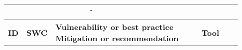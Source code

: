 
\begin{table*}
\centering
\begin{adjustbox}{max height=10cm}
\begin{tabular}{|c|c|m{9cm}|m{5mm}|m{5mm}|m{5mm}|m{5mm}|m{5mm}|m{5mm}|m{5mm}|}

\multicolumn{3}{c}{\.} &
\headrow{EY Review} &
\headrow{Smart Check} &
\headrow{Securify} &
\headrow{MythX (Mythril)} &
\headrow{Contract Guard} &
\headrow{Slither} &
\headrow{Odin} \\ \hline

\textbf{ID} & 
\textbf{SWC} & 
\textbf{Vulnerability or best practice \newline Mitigation or recommendation} &  
\multicolumn{7}{c|}{\textbf{Tool}} \\
\hline

\end{tabular}
\end{adjustbox}
\end{table*}
